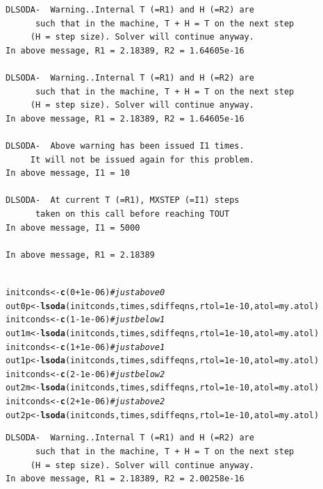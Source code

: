 \documentclass[a4paper]{article}\usepackage[]{graphicx}\usepackage[]{color}
\makeatletter
\newcommand{\hlnum}[1]{\textcolor[rgb]{0.686,0.059,0.569}{#1}}%
\newcommand{\hlcom}[1]{\textcolor[rgb]{0.678,0.584,0.686}{\textit{#1}}}%
\newcommand{\hlopt}[1]{\textcolor[rgb]{0,0,0}{#1}}%
\newcommand{\hlstd}[1]{\textcolor[rgb]{0.345,0.345,0.345}{#1}}%
\newcommand{\hlkwb}[1]{\textcolor[rgb]{0.69,0.353,0.396}{#1}}%
\newcommand{\hlkwc}[1]{\textcolor[rgb]{0.333,0.667,0.333}{#1}}%
\newcommand{\hlkwd}[1]{\textcolor[rgb]{0.737,0.353,0.396}{\textbf{#1}}}%
\newenvironment{kframe}{%
 \def\at@end@of@kframe{}%
 \ifinner\ifhmode%
  \def\at@end@of@kframe{\end{minipage}}%
  \begin{minipage}{\columnwidth}%
 \fi\fi%
 \def\FrameCommand##1{\hskip\@totalleftmargin \hskip-\fboxsep
 \colorbox{shadecolor}{##1}\hskip-\fboxsep
     \hskip-\linewidth \hskip-\@totalleftmargin \hskip\columnwidth}%
 \MakeFramed {\advance\hsize-\width
   \@totalleftmargin\z@ \linewidth\hsize
   \@setminipage}}%
 {\par\unskip\endMakeFramed%
 \at@end@of@kframe}
\newenvironment{knitrout}{}{} %
\makeatother
\begin{document}
\begin{knitrout}
\begin{kframe}
\begin{verbatim}
DLSODA-  Warning..Internal T (=R1) and H (=R2) are
      such that in the machine, T + H = T on the next step  
     (H = step size). Solver will continue anyway.
In above message, R1 = 2.18389, R2 = 1.64605e-16
 
DLSODA-  Warning..Internal T (=R1) and H (=R2) are
      such that in the machine, T + H = T on the next step  
     (H = step size). Solver will continue anyway.
In above message, R1 = 2.18389, R2 = 1.64605e-16
 
DLSODA-  Above warning has been issued I1 times.  
     It will not be issued again for this problem.
In above message, I1 = 10
 
DLSODA-  At current T (=R1), MXSTEP (=I1) steps   
      taken on this call before reaching TOUT     
In above message, I1 = 5000
 
In above message, R1 = 2.18389
 
\end{verbatim}
\begin{alltt}
\hlstd{initconds} \hlkwb{<-} \hlkwd{c}\hlstd{(}\hlnum{0} \hlopt{+} \hlnum{1e-06}\hlstd{)}  \hlcom{# just above 0}
\hlstd{out0p} \hlkwb{<-} \hlkwd{lsoda}\hlstd{(initconds, times, sdiffeqns,} \hlkwc{rtol} \hlstd{=} \hlnum{1e-10}\hlstd{,} \hlkwc{atol} \hlstd{= my.atol)}
\hlstd{initconds} \hlkwb{<-} \hlkwd{c}\hlstd{(}\hlnum{1} \hlopt{-} \hlnum{1e-06}\hlstd{)}  \hlcom{# just below 1}
\hlstd{out1m} \hlkwb{<-} \hlkwd{lsoda}\hlstd{(initconds, times, sdiffeqns,} \hlkwc{rtol} \hlstd{=} \hlnum{1e-10}\hlstd{,} \hlkwc{atol} \hlstd{= my.atol)}
\hlstd{initconds} \hlkwb{<-} \hlkwd{c}\hlstd{(}\hlnum{1} \hlopt{+} \hlnum{1e-06}\hlstd{)}  \hlcom{# just above 1}
\hlstd{out1p} \hlkwb{<-} \hlkwd{lsoda}\hlstd{(initconds, times, sdiffeqns,} \hlkwc{rtol} \hlstd{=} \hlnum{1e-10}\hlstd{,} \hlkwc{atol} \hlstd{= my.atol)}
\hlstd{initconds} \hlkwb{<-} \hlkwd{c}\hlstd{(}\hlnum{2} \hlopt{-} \hlnum{1e-06}\hlstd{)}  \hlcom{# just below 2}
\hlstd{out2m} \hlkwb{<-} \hlkwd{lsoda}\hlstd{(initconds, times, sdiffeqns,} \hlkwc{rtol} \hlstd{=} \hlnum{1e-10}\hlstd{,} \hlkwc{atol} \hlstd{= my.atol)}
\hlstd{initconds} \hlkwb{<-} \hlkwd{c}\hlstd{(}\hlnum{2} \hlopt{+} \hlnum{1e-06}\hlstd{)}  \hlcom{# just above 2}
\hlstd{out2p} \hlkwb{<-} \hlkwd{lsoda}\hlstd{(initconds, times, sdiffeqns,} \hlkwc{rtol} \hlstd{=} \hlnum{1e-10}\hlstd{,} \hlkwc{atol} \hlstd{= my.atol)}
\end{alltt}
\begin{verbatim}
DLSODA-  Warning..Internal T (=R1) and H (=R2) are
      such that in the machine, T + H = T on the next step  
     (H = step size). Solver will continue anyway.
In above message, R1 = 2.18389, R2 = 2.00258e-16
 

\end{verbatim}
\end{kframe}
\end{knitrout}
\end{document}
